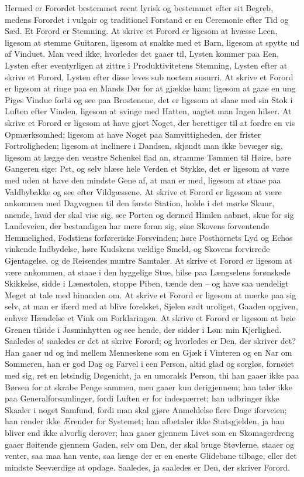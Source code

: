 \documentclass[12pt,a4paper]{article}
\begin{document}
Hermed er Forordet bestemmet reent lyrisk og bestemmet efter sit Begreb, medens Forordet i vulgair og traditionel Forstand er en Ceremonie efter Tid og Sæd. Et Forord er Stemning. At skrive et Forord er ligesom at hvæsse Leen, ligesom at stemme Guitaren, ligesom at snakke med et Barn, ligesom at spytte ud af Vinduet. Man veed ikke, hvorledes det gaaer til, Lysten kommer paa Een, Lysten efter eventyrligen at zittre i Produktivitetens Stemning, Lysten efter at skrive et Forord, Lysten efter disse leves sub noctem susurri. At skrive et Forord er ligesom at ringe paa en Mands Dør for at gjække ham; ligesom at gaae en ung Piges Vindue forbi og see paa Brostenene, det er ligesom at slaae med sin Stok i Luften efter Vinden, ligesom at svinge med Hatten, uagtet man Ingen hilser. At skrive et Forord er ligesom at have gjort Noget, der berettiger til at fordre en vis Opmærksomhed; ligesom at have Noget paa Samvittigheden, der frister Fortroligheden; ligesom at inclinere i Dandsen, skjøndt man ikke bevæger sig, ligesom at lægge den venstre Schenkel flad an, stramme Tømmen til Høire, høre Gangeren sige: Pst, og selv blæse hele Verden et Stykke, det er ligesom at være med uden at have den mindste Gene af, at man er med, ligesom at staae paa Valdbybakke og see efter Vildgæssene. At skrive et Forord er ligesom at være ankommen med Dagvognen til den første Station, holde i det mørke Skuur, anende, hvad der skal vise sig, see Porten og dermed Himlen aabnet, skue for sig Landeveien, der bestandigen har mere foran sig, øine Skovens forventende Hemmelighed, Fodstiens forføreriske Forsvinden; høre Posthornets Lyd og Echos vinkende Indbydelse, høre Kudskens vældige Smeld, og Skovens forvirrede Gjentagelse, og de Reisendes muntre Samtaler. At skrive et Forord er ligesom at være ankommen, at staae i den hyggelige Stue, hilse paa Længselens forønskede Skikkelse, sidde i Lænestolen, stoppe Piben, tænde den – og have saa uendeligt Meget at tale med hinanden om. At skrive et Forord er ligesom at mærke paa sig selv, at man er ifærd med at blive forelsket, Sjelen sødt uroliget, Gaaden opgiven, enhver Hændelse et Vink om Forklaringen. At skrive et Forord er ligesom at bøie Grenen tilside i Jasminhytten og see hende, der sidder i Løn: min Kjerlighed. Saaledes o! saaledes er det at skrive Forord; og hvorledes er Den, der skriver det? Han gaaer ud og ind mellem Menneskene som en Gjæk i Vinteren og en Nar om Sommeren, han er god Dag og Farvel i een Person, altid glad og sorgløs, fornøiet med sig, ret en letsindig Døgenicht, ja en umoralsk Person, thi han gaaer ikke paa Børsen for at skrabe Penge sammen, men gaaer kun derigjennem; han taler ikke paa Generalforsamlinger, fordi Luften er for indespærret; han udbringer ikke Skaaler i noget Samfund, fordi man skal gjøre Anmeldelse flere Dage iforveien; han render ikke Ærender for Systemet; han afbetaler ikke Statsgjelden, ja han bliver end ikke alvorlig derover; han gaaer gjennem Livet som en Skomagerdreng gaaer fløitende gjennem Gaden, selv om Den, der skal bruge Støvlerne, staaer og venter, saa maa han vente, saa længe der er en eneste Glidebane tilbage, eller det mindste Seeværdige at opdage. Saaledes, ja saaledes er Den, der skriver Forord.
\end{document}
